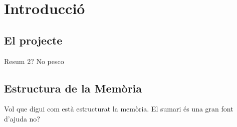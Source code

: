\section{Introducció}

\subsection*{El projecte}
Resum 2? No pesco
\subsection*{Estructura de la Memòria}
Vol que digui com està estructurat la memòria.
El sumari és una gran font d'ajuda no?